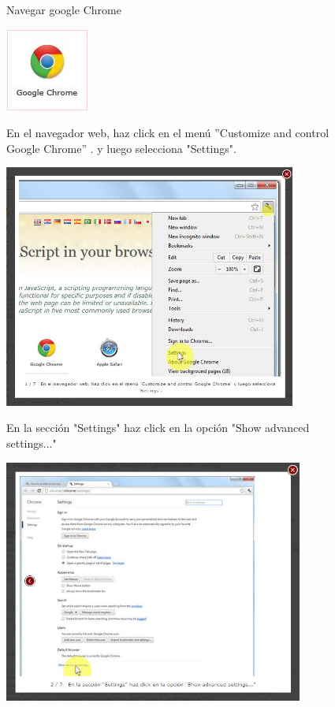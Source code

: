 \documentclass[11pt]{article} %
\begin{document}
\begin{figure}
\begin{center}
\begin{center}
Navegar google Chrome
\end{center}
\includegraphics[height=3 cm, width=3 cm] {chrome.jpg}

\begin{center}

En el navegador web, haz click en el menú ''Customize and control Google Chrome'' .
y luego selecciona "Settings".
\end{center}

\includegraphics[height=8cm, width=8 cm] {chrome 01.jpg}

\begin{center}
En la sección "Settings" haz click en la 
opción "Show advanced settings..."
\end{center}

\includegraphics[height=8cm, width=8 cm] {chrome 02.jpg}

\end{center}
\end{figure}
\end{document}
